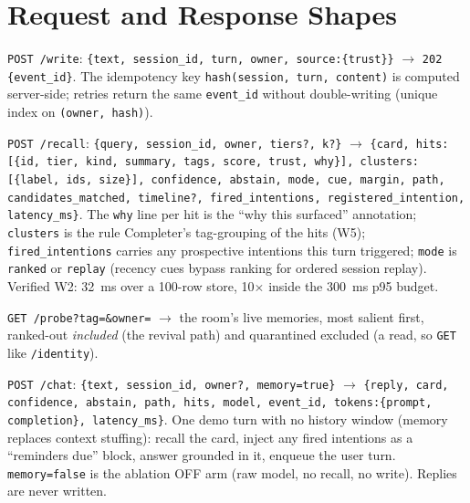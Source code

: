 \section{Request and Response Shapes}
\texttt{POST /write}: \texttt{\{text, session\_id, turn, owner, source:\{trust\}\}}
$\rightarrow$ \texttt{202 \{event\_id\}}. The idempotency key
\texttt{hash(session, turn, content)} is computed server-side; retries return the same
\texttt{event\_id} without double-writing (unique index on \texttt{(owner, hash)}).

\texttt{POST /recall}: \texttt{\{query, session\_id, owner, tiers?, k?\}}
$\rightarrow$ \texttt{\{card, hits:[\{id, tier, kind, summary, tags, score, trust, why\}],
clusters:[\{label, ids, size\}], confidence, abstain, mode, cue, margin, path,
candidates\_matched, timeline?, fired\_intentions, registered\_intention, latency\_ms\}}.
The \texttt{why} line per hit is the ``why this surfaced'' annotation;
\texttt{clusters} is the rule Completer's tag-grouping of the hits (W5);
\texttt{fired\_intentions} carries any prospective intentions this turn triggered;
\texttt{mode} is \texttt{ranked} or \texttt{replay} (recency cues bypass ranking for
ordered session replay). Verified W2: 32~ms over a 100-row store, 10$\times$ inside
the 300~ms p95 budget.

\texttt{GET /probe?tag=\&owner=} $\rightarrow$ the room's live memories, most salient
first, ranked-out \emph{included} (the revival path) and quarantined excluded
(a read, so \texttt{GET} like \texttt{/identity}).

\texttt{POST /chat}: \texttt{\{text, session\_id, owner?, memory=true\}} $\rightarrow$
\texttt{\{reply, card, confidence, abstain, path, hits, model, event\_id,
tokens:\{prompt, completion\}, latency\_ms\}}.
One demo turn with no history window (memory replaces context stuffing): recall the card,
inject any fired intentions as a ``reminders due'' block, answer grounded in it, enqueue
the user turn. \texttt{memory=false} is the ablation OFF arm
(raw model, no recall, no write). Replies are never written.

